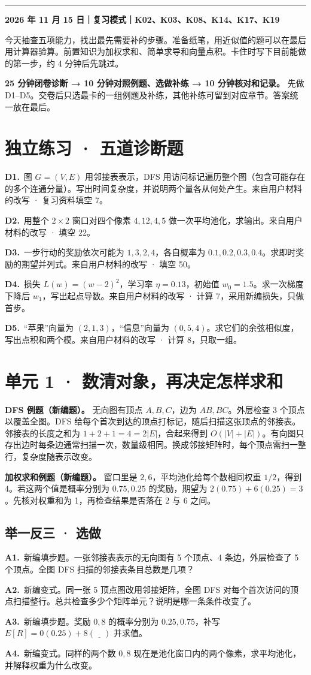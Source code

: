 \documentclass[UTF8,a4paper,11pt]{ctexart}
\newcommand{\chaptertitle}[1]{\Needspace{8\baselineskip}\noindent{\LARGE\bfseries\sffamily #1}\par\vspace{4mm}\hrule\vspace{6mm}}
\newcommand{\CompactQuestion}[2]{\par\noindent\textbf{#1.}\ #2\par\vspace{.8em}}
\begin{document}
\chaptertitle{第 1 天 · 45 分钟起点诊断}
\textbf{2026 年 11 月 15 日｜复习模式｜K02、K03、K08、K14、K17、K19}

今天抽查五项能力，找出最先需要补的步骤。准备纸笔，用近似值的题可以在最后用计算器验算。前置知识为加权求和、简单求导和向量点积。卡住时写下目前能做的第一步，约 4 分钟后先跳过。

\textbf{25 分钟闭卷诊断 → 10 分钟对照例题、选做补练 → 10 分钟核对和记录。} 先做 D1–D5。交卷后只选最卡的一组例题及补练，其他补练可留到对应章节。答案统一放在最后。

\section{独立练习 · 五道诊断题}
\CompactQuestion{D1}{图 $G=(V,E)$ 用邻接表表示，DFS 用访问标记遍历整个图（包含可能存在的多个连通分量）。写出时间复杂度，并说明两个量各从何处产生。来自用户材料的改写 · 复习资料填空 7。}
\CompactQuestion{D2}{用整个 $2\times2$ 窗口对四个像素 $4,12,4,5$ 做一次平均池化，求输出。来自用户材料的改写 · 填空 22。}
\CompactQuestion{D3}{一步行动的奖励依次可能为 $1,3,2,4$，各自概率为 $0.1,0.2,0.3,0.4$。求即时奖励的期望并列式。来自用户材料的改写 · 填空 50。}
\CompactQuestion{D4}{损失 $L(w)=(w-2)^2$，学习率 $\eta=0.13$，初始值 $w_0=1.5$。求一次梯度下降后 $w_1$，写出起点导数。来自用户材料的改写 · 计算 7，采用新编损失，只做首步。}
\CompactQuestion{D5}{“苹果”向量为 $(2,1,3)$，“信息”向量为 $(0,5,4)$。求它们的余弦相似度，写出点积和两个模。来自用户材料的改写 · 计算 8，只取一组。}
\clearpage
\section{单元 1 · 数清对象，再决定怎样求和}
\textbf{DFS 例题（新编题）。} 无向图有顶点 $A,B,C$，边为 $AB,BC$。外层检查 3 个顶点以覆盖全图。DFS 给每个首次到达的顶点打标记，随后扫描这张顶点的邻接表。邻接表的长度之和为 $1+2+1=4=2|E|$，合起来得到 $O(|V|+|E|)$。有向图只存出边时每条边通常扫描一次，数量级相同。换成邻接矩阵时，每个顶点需扫一整行，复杂度随表示改变。

\textbf{加权求和例题（新编题）。} 窗口里是 $2,6$，平均池化给每个数相同权重 $1/2$，得到 $4$。若这两个值是概率分别为 $0.75,0.25$ 的奖励，期望为 $2(0.75)+6(0.25)=3$。先核对权重和为 1，再检查结果是否落在 2 与 6 之间。

\subsection{举一反三 · 选做}
\CompactQuestion{A1}{新编填步题。一张邻接表表示的无向图有 5 个顶点、4 条边，外层检查了 5 个顶点。全图 DFS 扫描的邻接表条目总数是几项？}
\CompactQuestion{A2}{新编变式。同一张 5 顶点图改用邻接矩阵，全图 DFS 对每个首次访问的顶点扫描整行。总共检查多少个矩阵单元？说明是哪一条条件改变了。}
\CompactQuestion{A3}{新编填步题。奖励 $0,8$ 的概率分别为 $0.25,0.75$，补写 $E[R]=0(0.25)+8(\underline{\quad})$ 并求值。}
\CompactQuestion{A4}{新编变式。同样的两个数 $0,8$ 现在是池化窗口内的两个像素，求平均池化，并解释权重为什么改变。}
\clearpage
\end{document}
